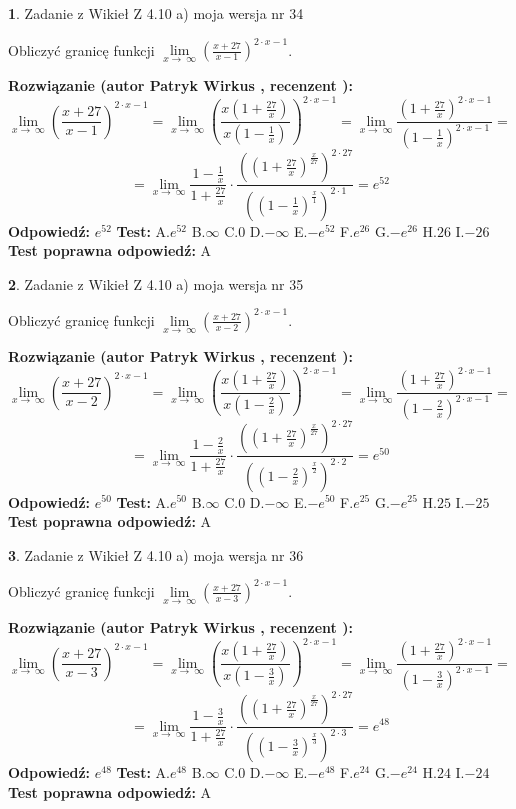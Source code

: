 \documentclass[12pt, a4paper]{article}
\theoremstyle{definition} %
\newtheorem{zad}{}
\newcommand{\zadStart}[1]{\begin{zad}#1\newline}
\newcommand{\zadStop}{\end{zad}}
\newcommand{\rozwStart}[2]{\noindent \textbf{Rozwiązanie (autor #1 , recenzent #2): }\newline}
\newcommand{\rozwStop}{\newline}
\newcommand{\odpStart}{\noindent \textbf{Odpowiedź:}\newline}
\newcommand{\odpStop}{\newline}
\newcommand{\testStart}{\noindent \textbf{Test:}\newline}
\newcommand{\testStop}{\newline}
\newcommand{\kluczStart}{\noindent \textbf{Test poprawna odpowiedź:}\newline}
\newcommand{\kluczStop}{\newline}
\begin{document}
\zadStart{Zadanie z Wikieł Z 4.10 a) moja wersja nr 34}

Obliczyć granicę funkcji  $\lim\limits_{x\to\ \infty}(\frac{x+27}{x-1})^{2\cdot x-1}$.
\zadStop
\rozwStart{Patryk Wirkus}{}
$$\lim\limits_{x\to\ \infty}(\frac{x+27}{x-1})^{2\cdot x-1} = \lim\limits_{x\to\ \infty}(\frac{x(1+\frac{27}{x})}{x(1-\frac{1}{x})})^{2\cdot x-1}=\lim\limits_{x\to\ \infty}\frac{(1+\frac{27}{x})^{2\cdot x-1}}{(1-\frac{1}{x})^{2\cdot x-1}}=$$
$$=\lim\limits_{x\to\ \infty}\frac{1-\frac{1}{x}}{1+\frac{27}{x}}\cdot\frac{((1+\frac{27}{x})^{\frac{x}{27}})^{2\cdot27}}{((1-\frac{1}{x})^{\frac{x}{1}})^{2\cdot1}}=e^{52}$$
\rozwStop
\odpStart
$e^{52}$
\odpStop
\testStart
A.$e^{52}$ B.$\infty$ C.$0$ D.$-\infty$ E.$-e^{52}$
F.$e^{26}$ G.$-e^{26}$
H.$26$
I.$-26$
\testStop
\kluczStart
A
\kluczStop



\zadStart{Zadanie z Wikieł Z 4.10 a) moja wersja nr 35}

Obliczyć granicę funkcji  $\lim\limits_{x\to\ \infty}(\frac{x+27}{x-2})^{2\cdot x-1}$.
\zadStop
\rozwStart{Patryk Wirkus}{}
$$\lim\limits_{x\to\ \infty}(\frac{x+27}{x-2})^{2\cdot x-1} = \lim\limits_{x\to\ \infty}(\frac{x(1+\frac{27}{x})}{x(1-\frac{2}{x})})^{2\cdot x-1}=\lim\limits_{x\to\ \infty}\frac{(1+\frac{27}{x})^{2\cdot x-1}}{(1-\frac{2}{x})^{2\cdot x-1}}=$$
$$=\lim\limits_{x\to\ \infty}\frac{1-\frac{2}{x}}{1+\frac{27}{x}}\cdot\frac{((1+\frac{27}{x})^{\frac{x}{27}})^{2\cdot27}}{((1-\frac{2}{x})^{\frac{x}{2}})^{2\cdot2}}=e^{50}$$
\rozwStop
\odpStart
$e^{50}$
\odpStop
\testStart
A.$e^{50}$ B.$\infty$ C.$0$ D.$-\infty$ E.$-e^{50}$
F.$e^{25}$ G.$-e^{25}$
H.$25$
I.$-25$
\testStop
\kluczStart
A
\kluczStop



\zadStart{Zadanie z Wikieł Z 4.10 a) moja wersja nr 36}

Obliczyć granicę funkcji  $\lim\limits_{x\to\ \infty}(\frac{x+27}{x-3})^{2\cdot x-1}$.
\zadStop
\rozwStart{Patryk Wirkus}{}
$$\lim\limits_{x\to\ \infty}(\frac{x+27}{x-3})^{2\cdot x-1} = \lim\limits_{x\to\ \infty}(\frac{x(1+\frac{27}{x})}{x(1-\frac{3}{x})})^{2\cdot x-1}=\lim\limits_{x\to\ \infty}\frac{(1+\frac{27}{x})^{2\cdot x-1}}{(1-\frac{3}{x})^{2\cdot x-1}}=$$
$$=\lim\limits_{x\to\ \infty}\frac{1-\frac{3}{x}}{1+\frac{27}{x}}\cdot\frac{((1+\frac{27}{x})^{\frac{x}{27}})^{2\cdot27}}{((1-\frac{3}{x})^{\frac{x}{3}})^{2\cdot3}}=e^{48}$$
\rozwStop
\odpStart
$e^{48}$
\odpStop
\testStart
A.$e^{48}$ B.$\infty$ C.$0$ D.$-\infty$ E.$-e^{48}$
F.$e^{24}$ G.$-e^{24}$
H.$24$
I.$-24$
\testStop
\kluczStart
A
\kluczStop
\end{document}
